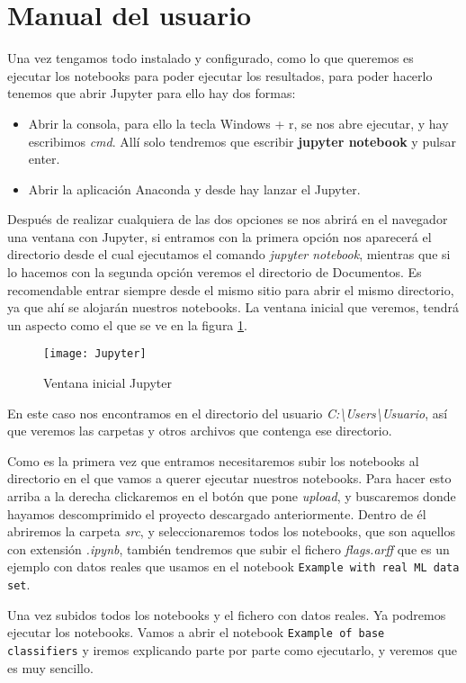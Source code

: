 \section{Manual del usuario}
Una vez tengamos todo instalado y configurado, como lo que queremos es ejecutar los notebooks para poder ejecutar los resultados, para poder hacerlo tenemos que abrir Jupyter para ello hay dos formas:
\begin{itemize}
	\item Abrir la consola, para ello la tecla Windows + r, se nos abre ejecutar, y hay escribimos \textit{cmd}. Allí solo tendremos que escribir \textbf{jupyter notebook} y pulsar enter.
	\item Abrir la aplicación Anaconda y desde hay lanzar el Jupyter.
\end{itemize}
Después de realizar cualquiera de las dos opciones se nos abrirá en el navegador una ventana con Jupyter, si entramos con la primera opción nos aparecerá el directorio desde el cual ejecutamos el comando \textit{jupyter notebook}, mientras que si lo hacemos con la segunda opción veremos el directorio de Documentos. Es recomendable entrar siempre desde el mismo sitio para abrir el mismo directorio, ya que ahí se alojarán nuestros notebooks. La ventana inicial que veremos, tendrá un aspecto como el que se ve en la figura \ref{fig:Jupyter}.

\begin{figure}
\centering
\texttt{[image: Jupyter]}
\caption{Ventana inicial Jupyter}
\label{fig:Jupyter}
\end{figure}

En este caso nos encontramos en el directorio del usuario \textit{C:\textbackslash Users\textbackslash Usuario}, así que veremos las carpetas y otros archivos que contenga ese directorio.

Como es la primera vez que entramos necesitaremos subir los notebooks al directorio en el que vamos a querer ejecutar nuestros notebooks. 
Para hacer esto arriba a la derecha clickaremos en el botón que pone \textit{upload}, y buscaremos donde hayamos descomprimido el proyecto descargado anteriormente. Dentro de él abriremos la carpeta \textit{src}, y seleccionaremos todos los notebooks, que son aquellos con extensión \textit{.ipynb}, también tendremos que subir el fichero \textit{flags.arff} que es un ejemplo con datos reales que usamos en el notebook \texttt{Example with real ML data set}.

Una vez subidos todos los notebooks y el fichero con datos reales. Ya podremos ejecutar los notebooks. Vamos a abrir el notebook \texttt{Example of base classifiers} y iremos explicando parte por parte como ejecutarlo, y veremos que es muy sencillo.

